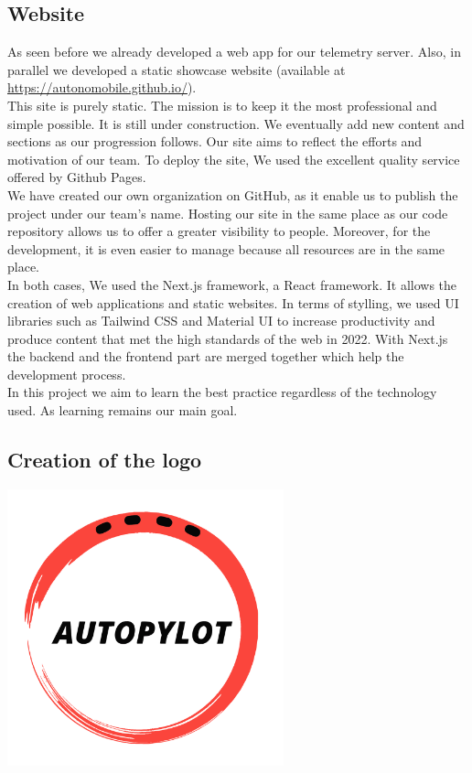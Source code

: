 \documentclass[12pt]{article}
\begin{document}
\newpage

\subsection{Website}
As seen before we already developed a web app for our telemetry server. Also, in parallel we developed a static showcase website (available at \href{https://autonomobile.github.io/}{https://autonomobile.github.io/}). \\

This site is purely static. The mission is to keep it the most professional and simple possible. It is still under construction. We eventually add new content and sections as our progression follows. Our site aims to reflect the efforts and motivation of our team. To deploy the site, We used the excellent quality service offered by Github Pages. \\

We have created our own organization on GitHub, as it enable us to publish the project under our team’s name. Hosting our site in the same place as our code repository allows us to offer a greater visibility to people. Moreover, for the development, it is even easier to manage because all resources are in the same place. \\

In both cases, We used the Next.js framework, a React framework. It allows the creation of web applications and static websites. In terms of stylling, we used UI libraries such as Tailwind CSS and Material UI to increase productivity and produce content that met the high standards of the web in 2022. With Next.js the backend and the frontend part are merged together which help the development process. \\

In this project we aim to learn the best practice regardless of the technology used. As learning remains our main goal.


\subsection{Creation of the logo}
\centerline{\includegraphics[height=8cm]{../../logos/logo-transparent-black.png}}
\end{document}
